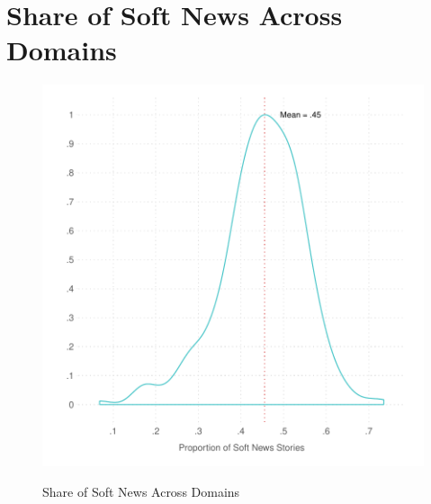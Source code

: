 \documentclass[12pt, letterpaper]{article}
\begin{document}
\clearpage
\section{Share of Soft News Across Domains}
\begin{figure}[!htbp]
\centering
\caption{Share of Soft News Across Domains}
\includegraphics[scale=.9]{../figs/prop_soft_news_by_domain.pdf}
\label{fig:agg_density_domain}
\end{figure}
\end{document}
